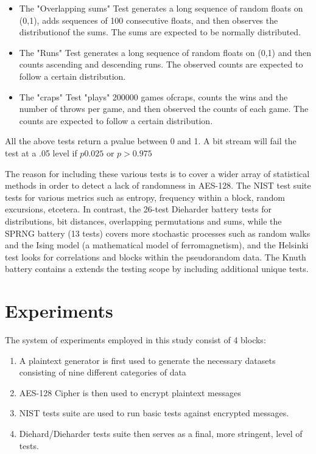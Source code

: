 \documentclass[conference]{IEEEtran}
\begin{document}
\begin{itemize}
  \item The "Overlapping sums" Test generates a long sequence of random floats on (0,1), adds sequences of 100 consecutive floats, and then observes the distributionof the sums.  The sums are expected to be normally distributed.
  \item The "Runs" Test generates a long sequence of random floats on (0,1) and then counts ascending and descending runs. The observed counts are expected to follow a certain distribution.
  \item The "craps" Test "plays" 200000 games ofcraps, counts the wins and the number of throws per game, and then observed the counts of each game. The counts are expected to follow a certain distribution.
  
 \end{itemize}
  
All the above tests return a pvalue between 0 and 1. A bit stream will fail the test at a .05 level if $p  0.025$ or $p > 0.975$

The reason for including these various tests is to cover a wider array of statistical methods in order to detect a lack of randomness in AES-128. The NIST test suite tests for various metrics such as entropy, frequency within a block, random excursions, etcetera. In contrast, the 26-test Dieharder battery tests for distributions, bit distances, overlapping permutations and sums, while the SPRNG battery (13 tests) covers more stochastic processes such as random walks and the Ising model (a
mathematical model of ferromagnetism), and the Helsinki test looks for correlations and blocks within the pseudorandom data. The Knuth battery contains a extends the testing scope by including additional unique tests. 

\section{Experiments}

The system of experiments employed in this study consist of 4 blocks:

\begin{enumerate}
  \item A plaintext generator is first used to  generate the necessary datasets consisting of nine different categories of data
  \item AES-128 Cipher  is then used  to encrypt plaintext messages
  \item NIST tests suite are used to run basic tests against encrypted messages.
  \item Diehard/Dieharder tests suite then serves as a final, more stringent, level of tests. 
\end{enumerate}
\end{document}
